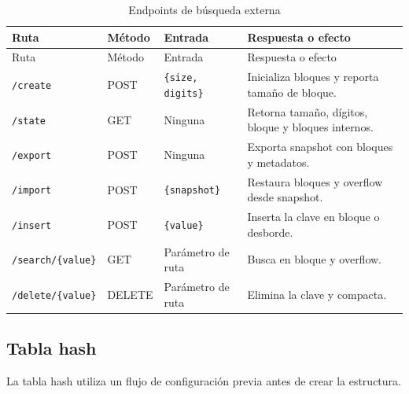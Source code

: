 \documentclass[12pt,onecolumn]{IEEEtran}
\begin{document}
\begin{longtable}{>{\raggedright\arraybackslash}p{3.2cm}p{2.4cm}p{4.1cm}p{5.0cm}}
\caption{Endpoints de búsqueda externa}\label{tab:endpoints-external}\\
\toprule
Ruta & Método & Entrada & Respuesta o efecto \\
\midrule
\endfirsthead
\toprule
Ruta & Método & Entrada & Respuesta o efecto \\
\midrule
\endhead
\texttt{/create} & POST & \texttt{\{size, digits\}} & Inicializa bloques y reporta tamaño de bloque. \\
\texttt{/state} & GET & Ninguna & Retorna tamaño, dígitos, bloque y bloques internos. \\
\texttt{/export} & POST & Ninguna & Exporta snapshot con bloques y metadatos. \\
\texttt{/import} & POST & \texttt{\{snapshot\}} & Restaura bloques y overflow desde snapshot. \\
\texttt{/insert} & POST & \texttt{\{value\}} & Inserta la clave en bloque o desborde. \\
\texttt{/search/\{value\}} & GET & Parámetro de ruta & Busca en bloque y overflow. \\
\texttt{/delete/\{value\}} & DELETE & Parámetro de ruta & Elimina la clave y compacta. \\
\bottomrule
\end{longtable}

\subsection{Tabla hash}
La tabla hash utiliza un flujo de configuración previa antes de crear la estructura.
\end{document}
